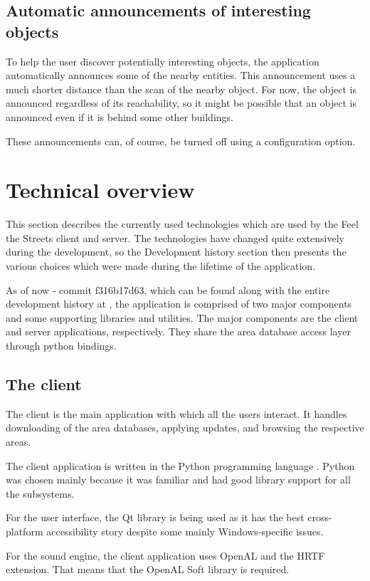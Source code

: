 \documentclass[nolof,digital]{fithesis3}
\begin{document}
\subsection{Automatic announcements of interesting objects}
To help the user discover potentially interesting objects, the application automatically announces some of the nearby entities. This announcement uses a much shorter distance than the scan of the nearby object. For now, the object is announced regardless of its reachability, so it might be possible that an object is announced even if it is behind some other buildings.

These announcements can, of course, be turned off using a configuration option.
\section{Technical overview}
This section describes the currently used technologies which are used by the Feel the Streets client and server. The technologies have changed quite extensively during the development, so the Development history section then presents the various choices which were made during the lifetime of the application.

As of now - commit f316b17d63, which can be found along with the entire development history at \parencite{fts_repo}, the application is comprised of two major components and some supporting libraries and utilities. The major components are the client and server applications, respectively. They share the area database access layer through python bindings.
\subsection{The client}
The client is the main application with which all the users interact. It handles downloading of the area databases, applying updates, and browsing the respective areas.

The client application is written in the Python programming language \parencite{python}. Python was chosen mainly because it was familiar and had good library support for all the subsystems.

For the user interface, the Qt library \parencite{qt} is being used as it has the best cross-platform accessibility story despite some mainly Windows-specific issues.

For the sound engine, the client application uses OpenAL and the HRTF extension. That means that the OpenAL Soft library \parencite{openalsoft} is required.
\end{document}
